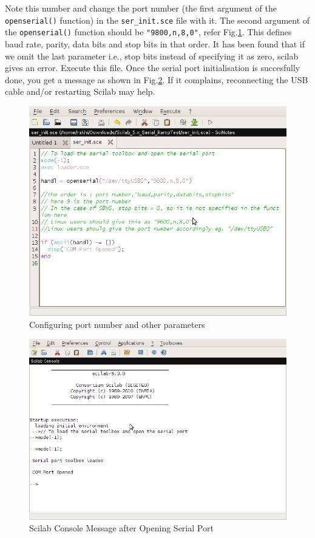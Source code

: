 Note this number and change the port number (the first argument of the \\ {\tt openserial()} function) in the {\tt ser\_init.sce} file with it. The second argument of the {\tt openserial()} function should be {\tt "9800,n,8,0"}, refer Fig.\ref{linuxserial}. This defines baud rate, parity, data bits and stop bits in that order. It has been found that if we omit the last parameter i.e., stop bits instead of specifying it as zero, scilab gives an error. Execute this file. Once the serial port initialisation is succesfully done, you get a message as shown in Fig.\ref{console_linux}. If it complains, reconnecting the USB cable and/or restarting Scilab may help.
\begin{figure}
\centering
\includegraphics[width=\linewidth]{using-sbhs/linuxserial.png}
\caption{Configuring port number and other parameters}
\label{linuxserial}
\end{figure}


\begin{figure}
\centering
\includegraphics[width=0.7\linewidth]{using-sbhs/SSscilab.png}
\caption{Scilab Console Message after Opening Serial Port}
\label{console_linux}
\end{figure}

